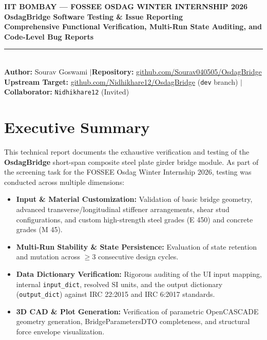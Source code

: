 \documentclass[11pt,a4paper]{article}
\begin{document}
\begin{center}
    {\Large \textbf{\textcolor{osdagblue}{IIT BOMBAY --- FOSSEE OSDAG WINTER INTERNSHIP 2026}}}\\[0.3em]
    {\LARGE \textbf{OsdagBridge Software Testing \& Issue Reporting}}\\[0.2em]
    {\large \textbf{Comprehensive Functional Verification, Multi-Run State Auditing, and Code-Level Bug Reports}}\\[1em]
    \rule{\linewidth}{1.2pt}\\[0.8em]
    \textbf{Author:} Sourav Goswami \quad$\vert$\quad \textbf{Repository:} \href{https://github.com/Sourav040505/OsdagBridge}{github.com/Sourav040505/OsdagBridge}\\
    \textbf{Upstream Target:} \href{https://github.com/Nidhikhare12/OsdagBridge}{github.com/Nidhikhare12/OsdagBridge} (\texttt{dev} branch) \quad$\vert$\quad \textbf{Collaborator:} \texttt{Nidhikhare12} (Invited)
\end{center}

\vspace{0.5em}

\section{Executive Summary}
This technical report documents the exhaustive verification and testing of the \textbf{OsdagBridge} short-span composite steel plate girder bridge module. As part of the screening task for the FOSSEE Osdag Winter Internship 2026, testing was conducted across multiple dimensions:
\begin{itemize}[noitemsep,topsep=2pt]
    \item \textbf{Input \& Material Customization:} Validation of basic bridge geometry, advanced transverse/longitudinal stiffener arrangements, shear stud configurations, and custom high-strength steel grades (E 450) and concrete grades (M 45).
    \item \textbf{Multi-Run Stability \& State Persistence:} Evaluation of state retention and mutation across $\ge 3$ consecutive design cycles.
    \item \textbf{Data Dictionary Verification:} Rigorous auditing of the UI input mapping, internal \texttt{input\_dict}, resolved SI units, and the output dictionary (\texttt{output\_dict}) against IRC 22:2015 and IRC 6:2017 standards.
    \item \textbf{3D CAD \& Plot Generation:} Verification of parametric OpenCASCADE geometry generation, BridgeParametersDTO completeness, and structural force envelope visualization.
\end{itemize}
\end{document}
